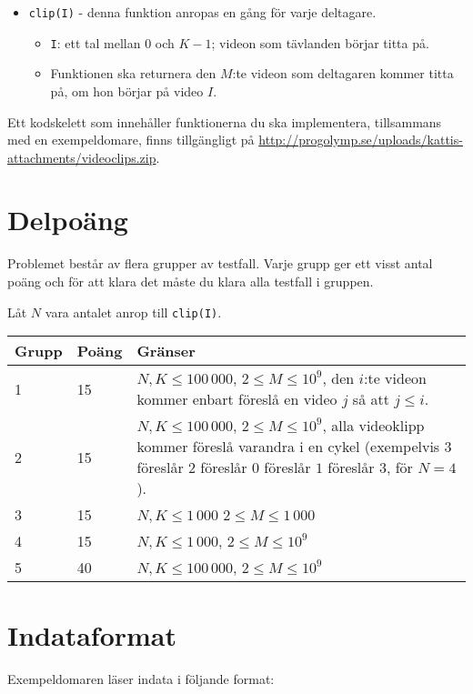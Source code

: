 \begin{itemize}
  \item \texttt{clip(I)} - denna funktion anropas en gång för varje deltagare.
  \begin{itemize}
    \item \texttt{I}: ett tal mellan $0$ och $K - 1$; videon som tävlanden börjar titta på.
		\item Funktionen ska returnera den $M$:te videon som deltagaren kommer titta på, om hon börjar på video $I$.
  \end{itemize}
\end{itemize}

Ett kodskelett som innehåller funktionerna du ska implementera, tillsammans med en exempeldomare, finns tillgängligt på
\url{http://progolymp.se/uploads/kattis-attachments/videoclips.zip}.

\section*{Delpoäng}
Problemet består av flera grupper av testfall. Varje grupp ger ett visst antal poäng och för att klara det måste du klara alla testfall i gruppen.

Låt $N$ vara antalet anrop till \texttt{clip(I)}.

\begin{tabular}{|l|l|p{7cm}|}
  \hline
  \textbf{Grupp} & \textbf{Poäng} & \textbf{Gränser} \\ \hline
  1 & 15 & $N, K \le 100\,000$, $2 \le M \le 10^9$, den $i$:te videon kommer enbart föreslå en video $j$ så att $j \le i$. \\ \hline
  2 & 15 & $N, K \le 100\,000$, $2 \le M \le 10^9$, alla videoklipp kommer föreslå varandra i en cykel (exempelvis $3$ föreslår $2$ föreslår $0$ föreslår $1$ föreslår $3$, för $N = 4$). \\ \hline
  3 & 15 & $N, K \le 1\,000$ $2 \le M \le 1\,000$ \\ \hline
  4 & 15 & $N, K \le 1\,000$, $2 \le M \le 10^9$ \\ \hline
  5 & 40 & $N, K \le 100\,000$, $2 \le M \le 10^9$ \\ \hline
\end{tabular}

\section*{Indataformat}
Exempeldomaren läser indata i följande format:

